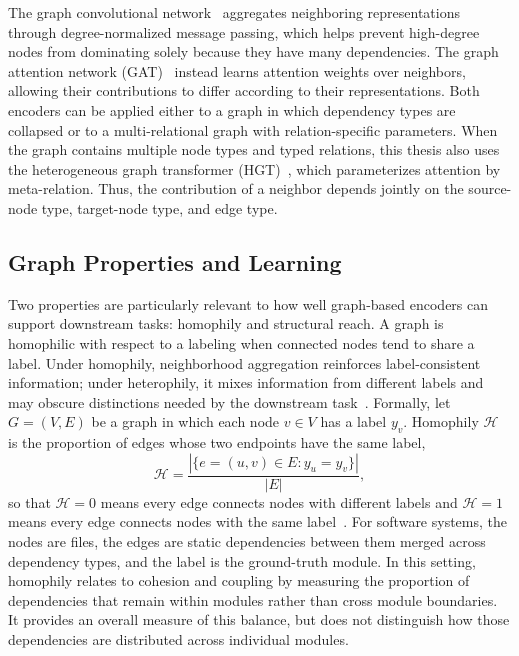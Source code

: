 The graph convolutional network~\cite{gcn} aggregates neighboring representations through degree-normalized message passing, which helps prevent high-degree nodes from dominating solely because they have many dependencies. The graph attention network (GAT)~\cite{gat} instead learns attention weights over neighbors, allowing their contributions to differ according to their representations. Both encoders can be applied either to a graph in which dependency types are collapsed or to a multi-relational graph with relation-specific parameters. When the graph contains multiple node types and typed relations, this thesis also uses the heterogeneous graph transformer (HGT)~\cite{hgt}, which parameterizes attention by meta-relation. Thus, the contribution of a neighbor depends jointly on the source-node type, target-node type, and edge type.
\subsection{Graph Properties and Learning \label{sec:bg_properties}}

Two properties are particularly relevant to how well graph-based encoders can support downstream tasks: homophily and structural reach. A graph is homophilic with respect to a labeling when connected nodes tend to share a label. Under homophily, neighborhood aggregation reinforces label-consistent information; under heterophily, it mixes information from different labels and may obscure distinctions needed by the downstream task~\cite{gnn_homophily}. Formally, let $G=(V,E)$ be a graph in which each node $v \in V$ has a label $y_v$. Homophily $\mathcal{H}$ is the proportion of edges whose two endpoints have the same label,
\begin{equation}
\mathcal{H} = \frac{|\{e=(u,v) \in E : y_u = y_v\}|}{|E|},
\label{eq:homophily}
\end{equation}
so that $\mathcal{H}=0$ means every edge connects nodes with different labels and $\mathcal{H}=1$ means every edge connects nodes with the same label~\cite{gnn_homophily}. For software systems, the nodes are files, the edges are static dependencies between them merged across dependency types, and the label is the ground-truth module. In this setting, homophily relates to cohesion and coupling by measuring the proportion of dependencies that remain within modules rather than cross module boundaries. It provides an overall measure of this balance, but does not distinguish how those dependencies are distributed across individual modules.


